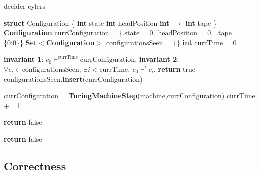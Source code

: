 \begin{algorithm}[H]
  \caption{{\sc decider-cylers}}\label{alg:cyclers}

  \begin{algorithmic}[1]

    \State \textbf{struct} Configuration \{
    \State \tabi\textbf{int} state
    \State \tabi\textbf{int} headPosition
    \State \tabi\textbf{int $\boldsymbol{\to}$ int} tape
    \State \}
    \State
    \State \textbf{Configuration} currConfiguration = \{.state = 0,$\,$.headPosition = 0,$\,$ .tape = \{0:0\}\}
    \State \textbf{Set$\boldsymbol{<}$Configuration$\boldsymbol{>}$} configurationsSeen = \{\}
    \State \textbf{int} currTime = 0

    \State \textbf{invariant 1}:
        $c_0 \vdash^\text{currTime} \text{currConfiguration}$.
    \State \textbf{invariant 2}:
        $\forall c_i \in \text{configurationsSeen},\ 
            \exists i < \text{currTime},\ c_0 \vdash^i c_i$.
    \State \textbf{return} true
    \EndIf
    \State configurationsSeen.\textbf{insert}(currConfiguration)

    \State currConfiguration = \textbf{TuringMachineStep}(machine,currConfiguration)
    \State currTime += 1


    \State \textbf{return} false 
    \EndIf
    \EndWhile

    \State \textbf{return} false
    \EndProcedure

  \end{algorithmic}
\end{algorithm}

\subsection{Correctness}



